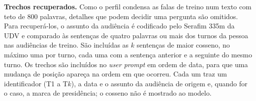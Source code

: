 \textbf{Trechos recuperados.} Como o perfil condensa as falas de treino num texto com teto de 800
palavras, detalhes que podem decidir uma pergunta são omitidos. Para recuperá-los, o assunto da
audiência é codificado pelo Serafim 335m da UDV e comparado às sentenças de quatro palavras ou mais
dos turnos da pessoa nas audiências de treino. São incluídas as $k$ sentenças de maior cosseno, no
máximo uma por turno, cada uma com a sentença anterior e a seguinte do mesmo turno. Os trechos são
incluídos no \textit{user prompt} em ordem de data, para que uma mudança de posição apareça na ordem
em que ocorreu. Cada um traz um identificador (T1 a T$k$), a data e o assunto da audiência de origem
e, quando for o caso, a marca de presidência; o cosseno não é mostrado ao modelo.
